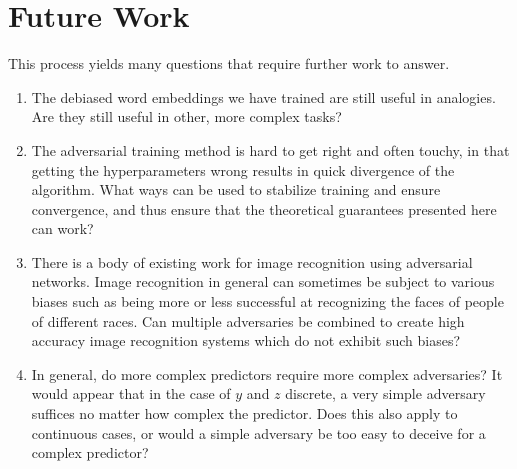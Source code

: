 \documentclass[letterpaper]{article} %
\theoremstyle{definition}
\begin{document}
\section{Future Work}

This process yields many questions that require further work to answer.
\begin{enumerate}
    \item The debiased word embeddings we have trained are still useful in analogies. Are they still useful in other, more complex tasks?
    \item The adversarial training method is hard to get right and often touchy, in that getting the hyperparameters wrong results in quick divergence of the algorithm. What ways can be used to stabilize training and ensure convergence, and thus ensure that the theoretical guarantees presented here can work?
    \item There is a body of existing work for image recognition using adversarial networks.  Image recognition in general can sometimes be subject to various biases such as being more or less successful at recognizing the faces of people of different races.  Can multiple adversaries be combined to create high accuracy image recognition systems which do not exhibit such biases?
    \item In general, do more complex predictors require more complex adversaries? It would appear that in the case of $y$ and $z$ discrete, a very simple adversary suffices no matter how complex the predictor. Does this also apply to continuous cases, or would a simple adversary be too easy to deceive for a complex predictor?
\end{enumerate}





%
 
\end{document}
